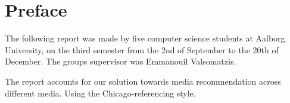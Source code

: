 \chapter*{Preface}
The following report was made by five computer science students at Aalborg University, on the third semester from the 2nd of September to the 20th of December. The groups supervisor was Emmanouil Valsomatzis.


The report accounts for our solution towards media recommendation across different media. Using the Chicago-referencing style.

\null
\vfill
{}